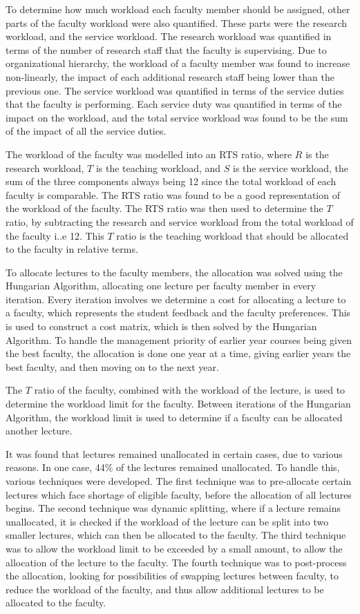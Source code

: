 To determine how much workload each faculty member should be assigned, other parts of the faculty workload were also quantified. These parts were the research workload, and the service workload. The research workload was quantified in terms of the number of research staff that the faculty is supervising. Due to organizational hierarchy, the workload of a faculty member was found to increase non-linearly, the impact of each additional research staff being lower than the previous one. The service workload was quantified in terms of the service duties that the faculty is performing. Each service duty was quantified in terms of the impact on the workload, and the total service workload was found to be the sum of the impact of all the service duties.

The workload of the faculty was modelled into an RTS ratio, where $R$ is the research workload, $T$ is the teaching workload, and $S$ is the service workload, the sum of the three components always being 12 since the total workload of each faculty is comparable. The RTS ratio was found to be a good representation of the workload of the faculty. The RTS ratio was then used to determine the $T$ ratio, by subtracting the research and service workload from the total workload of the faculty i..e 12. This $T$ ratio is the teaching workload that should be allocated to the faculty in relative terms.

To allocate lectures to the faculty members, the allocation was solved using the Hungarian Algorithm, allocating one lecture per faculty member in every iteration. Every iteration involves we determine a cost for allocating a lecture to a faculty, which represents the student feedback and the faculty preferences. This is used to construct a cost matrix, which is then solved by the Hungarian Algorithm. To handle the management priority of earlier year courses being given the best faculty, the allocation is done one year at a time, giving earlier years the best faculty, and then moving on to the next year.

The $T$ ratio of the faculty, combined with the workload of the lecture, is used to determine the workload limit for the faculty. Between iterations of the Hungarian Algorithm, the workload limit is used to determine if a faculty can be allocated another lecture.

It was found that lectures remained unallocated in certain cases, due to various reasons. In one case, 44\% of the lectures remained unallocated. To handle this, various techniques were developed. The first technique was to pre-allocate certain lectures which face shortage of eligible faculty, before the allocation of all lectures begins. The second technique was dynamic splitting, where if a lecture remains unallocated, it is checked if the workload of the lecture can be split into two smaller lectures, which can then be allocated to the faculty. The third technique was to allow the workload limit to be exceeded by a small amount, to allow the allocation of the lecture to the faculty. The fourth technique was to post-process the allocation, looking for possibilities of swapping lectures between faculty, to reduce the workload of the faculty, and thus allow additional lectures to be allocated to the faculty.

